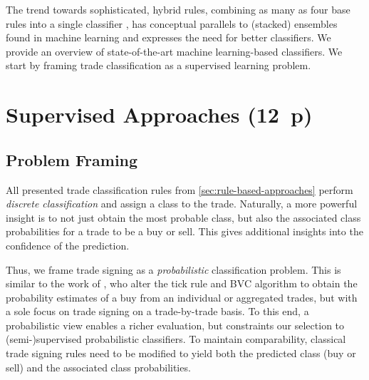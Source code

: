 The trend towards sophisticated, hybrid rules, combining as many as four base rules into a single classifier \autocite[cp.][18]{grauerOptionTradeClassification2022}, has conceptual parallels to (stacked) ensembles found in machine learning and expresses the need for better classifiers. We provide an overview of state-of-the-art machine learning-based classifiers. We start by framing trade classification as a supervised learning 
problem.


\newpage
{}
\section{Supervised Approaches (12~p)}\label{sec:supervised-approaches}


\subsection{Problem Framing}\label{sec:problem-framing}

All presented trade classification rules from \cref{sec:rule-based-approaches}  perform \emph{discrete classification} and assign a class to the trade. Naturally, a more powerful insight is to not just obtain the most probable class, but also the associated class probabilities for a trade to be a buy or sell. This gives additional insights into the confidence of the prediction.

Thus, we frame trade signing as a \emph{probabilistic} classification problem. This is similar to the work of \textcite[][272]{easleyDiscerningInformationTrade2016}, who alter the tick rule and \gls{BVC} algorithm to obtain the probability estimates of a buy from an individual or aggregated trades, but with a sole focus on trade signing on a trade-by-trade basis. To this end, a probabilistic view enables a richer evaluation, but constraints our selection to (semi-)supervised probabilistic classifiers. To maintain comparability, classical trade signing rules need to be modified to yield both the predicted class (buy or sell) and the associated class probabilities.

